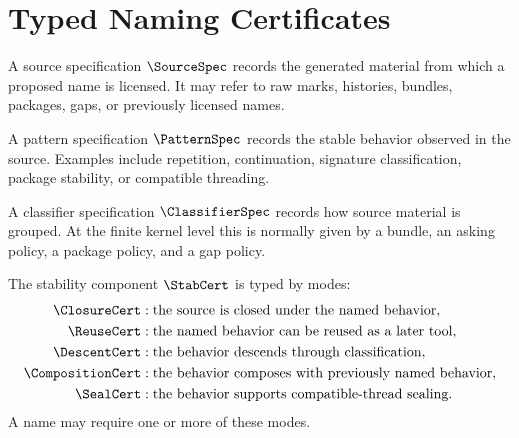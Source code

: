 \chapter{Typed Naming Certificates}
\label{ch:core-typed-naming-certificates}

\begin{definition}
A source specification \(\SourceSpec\) records the generated material from which a proposed name is licensed. It may refer to raw marks, histories, bundles, packages, gaps, or previously licensed names.
\end{definition}

\begin{definition}
A pattern specification \(\PatternSpec\) records the stable behavior observed in the source. Examples include repetition, continuation, signature classification, package stability, or compatible threading.
\end{definition}

\begin{definition}
A classifier specification \(\ClassifierSpec\) records how source material is grouped. At the finite kernel level this is normally given by a bundle, an asking policy, a package policy, and a gap policy.
\end{definition}

\begin{definition}
\label{def:naming-certificate-stability-field}
The stability component \(\StabCert\) is typed by modes:
$$
\begin{aligned}
\ClosureCert &: \text{the source is closed under the named behavior},\\
\ReuseCert &: \text{the named behavior can be reused as a later tool},\\
\DescentCert &: \text{the behavior descends through classification},\\
\CompositionCert &: \text{the behavior composes with previously named behavior},\\
\SealCert &: \text{the behavior supports compatible-thread sealing}.
\end{aligned}
$$
A name may require one or more of these modes.
\end{definition}

